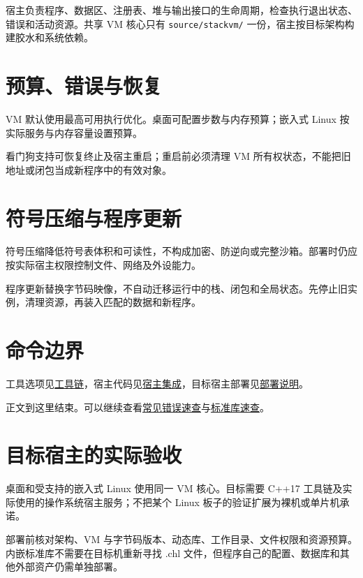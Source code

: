 宿主负责程序、数据区、注册表、堆与输出接口的生命周期，检查执行退出状态、错误和活动资源。共享 VM 核心只有 \texttt{source/\allowbreak{}stackvm/\allowbreak{}} 一份，宿主按目标架构构建胶水和系统依赖。

\section{预算、错误与恢复}

VM 默认使用最高可用执行优化。桌面可配置步数与内存预算；嵌入式 Linux 按实际服务与内存容量设置预算。

看门狗支持可恢复终止及宿主重启；重启前必须清理 VM 所有权状态，不能把旧地址或闭包当成新程序中的有效对象。

\section{符号压缩与程序更新}

符号压缩降低符号表体积和可读性，不构成加密、防逆向或完整沙箱。部署时仍应按实际宿主权限控制文件、网络及外设能力。

程序更新替换字节码映像，不自动迁移运行中的栈、闭包和全局状态。先停止旧实例，清理资源，再装入匹配的数据和新程序。

\section{命令边界}

工具选项见\href{https://gitee.com/rabbitc999/chali/blob/master/doc/09-toolchain.md}{工具链}，宿主代码见\href{https://gitee.com/rabbitc999/chali/blob/master/doc/08-host-integration.md}{宿主集成}，目标宿主部署见\href{https://gitee.com/rabbitc999/chali/blob/master/doc/06-deployment.md}{部署说明}。

正文到这里结束。可以继续查看\hyperref[ch:appA]{常见错误速查}与\hyperref[ch:appB]{标准库速查}。

\section{目标宿主的实际验收}

桌面和受支持的嵌入式 Linux 使用同一 VM 核心。目标需要 C++17 工具链及实际使用的操作系统宿主服务；不把某个 Linux 板子的验证扩展为裸机或单片机承诺。

部署前核对架构、VM 与字节码版本、动态库、工作目录、文件权限和资源预算。内嵌标准库不需要在目标机重新寻找 .chl 文件，但程序自己的配置、数据库和其他外部资产仍需单独部署。

